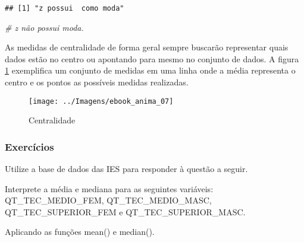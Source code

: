\documentclass[12pt,]{style/krantz}
\makeatletter
\newenvironment{Shaded}{\begin{snugshade}}{\end{snugshade}}
\newcommand{\CommentTok}[1]{\textcolor[rgb]{0.56,0.35,0.01}{\textit{#1}}}
\newenvironment{kframe}{%
\medskip{}
\setlength{\fboxsep}{.8em}
 \def\at@end@of@kframe{}%
 \ifinner\ifhmode%
  \def\at@end@of@kframe{\end{minipage}}%
  \begin{minipage}{\columnwidth}%
 \fi\fi%
 \def\FrameCommand##1{\hskip\@totalleftmargin \hskip-\fboxsep
 \colorbox{shadecolor}{##1}\hskip-\fboxsep
     \hskip-\linewidth \hskip-\@totalleftmargin \hskip\columnwidth}%
 \MakeFramed {\advance\hsize-\width
   \@totalleftmargin\z@ \linewidth\hsize
   \@setminipage}}%
 {\par\unskip\endMakeFramed%
 \at@end@of@kframe}
\renewenvironment{Shaded}{\begin{kframe}}{\end{kframe}}
\theoremstyle{definition}
\theoremstyle{definition}
\theoremstyle{definition}
\theoremstyle{remark}
\let\BeginKnitrBlock\begin \let\EndKnitrBlock\end
\makeatother
\begin{document}
\begin{verbatim}
## [1] "z possui  como moda"
\end{verbatim}

\begin{Shaded}
\begin{Highlighting}[]
\CommentTok{# z não possui moda.}
\end{Highlighting}
\end{Shaded}

As medidas de centralidade de forma geral sempre buscarão representar
quais dados estão no centro ou apontando para mesmo no conjunto de
dados. A figura \ref{fig:fig08} exemplifica um conjunto de medidas em
uma linha onde a média representa o centro e os pontos as possíveis
medidas realizadas.

\begin{figure}[H]

{\centering \texttt{[image: ../Imagens/ebook\_anima\_07]} 

}

\caption{Centralidade}\label{fig:fig08}
\end{figure}

\subsubsection{Exercícios}\label{exercicios-1}

Utilize a base de dados das IES para responder à questão a seguir.

\BeginKnitrBlock{exercise}
\protect\hypertarget{exr:unnamed-chunk-58}{}{\label{exr:unnamed-chunk-58}
}Interprete a média e mediana para as seguintes variáveis:
QT\_TEC\_MEDIO\_FEM, QT\_TEC\_MEDIO\_MASC, QT\_TEC\_SUPERIOR\_FEM e
QT\_TEC\_SUPERIOR\_MASC.
\EndKnitrBlock{exercise}

\BeginKnitrBlock{solution}
\iffalse{} {Solução. } \fi{}Aplicando as funções mean() e median().
\EndKnitrBlock{solution}
\end{document}
